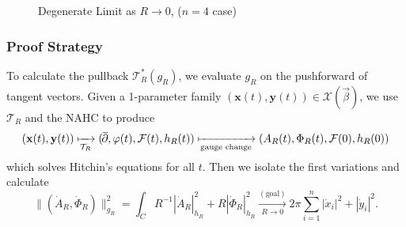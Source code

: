 \documentclass[aspectratio=1610,10pt]{beamer}
\theoremstyle{definition}
\theoremstyle{named}
\renewcommand{\bar}[1]{\overline{\hspace{-1pt}{#1}\hspace{-.2pt}}}
\DeclareMathOperator{\delbar}{\bar\partial}
\newcommand{\bx}{\mathbf{x}}
\newcommand{\by}{\mathbf{y}}
\begin{document}
\begin{frame}
\begin{figure}
\begin{center}
{\begin{tikzpicture}
    \end{tikzpicture}
    }
    \end{center}
    \caption{Degenerate Limit as $R\to0$, ($n=4$ case)}
    \end{figure}
\end{frame}


\begin{frame}
    \frametitle{Proof Strategy}
    To calculate the pullback $\mathcal T_R^*(g_R)$, we evaluate $g_R$ on the pushforward of tangent vectors.  Given a 1-parameter family $(\bx(t),\by(t))\in\mathcal X(\vec\beta)$, we use $\mathcal T_R$ and the NAHC to produce
    \begin{align*}
        (\bx(t),\by(t))
            \xmapsto[\mathcal T_R]{}(\delbar,\varphi(t),\mathcal F(t),h_R(t))
            \xmapsto[\text{gauge change}]{}(A_R(t),\Phi_R(t),\mathcal F(0),h_R(0))
    \end{align*}
    which solves Hitchin's equations for all $t$.
    \vfill
    \pause
    Then we isolate the first variations and calculate
        $$\|(\dot A_R,\dot\Phi_R)\|_{g_R}^2=\int_C R^{-1}|\dot A_R|_{h_R}^2+R|\dot\Phi_R|_{h_R}^2\xrightarrow[R\to0]{\mathrm{(goal)}}2\pi\sum_{i=1}^n|\dot x_i|^2+|\dot y_i|^2.$$
\end{frame}
\end{document}
